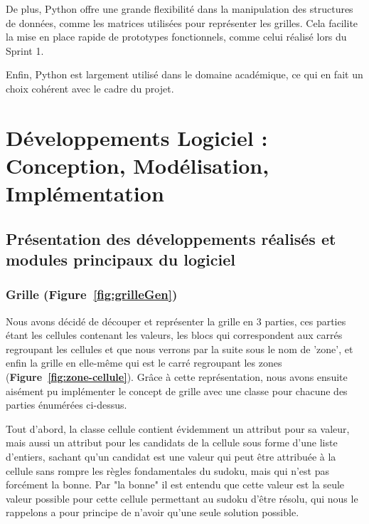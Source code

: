\documentclass[a4paper]{article}
\begin{document}
De plus, Python offre une grande flexibilité dans la manipulation des structures de données, comme les matrices utilisées pour représenter les grilles. Cela facilite la mise en place rapide de prototypes fonctionnels, comme celui réalisé lors du Sprint 1.

Enfin, Python est largement utilisé dans le domaine académique, ce qui en fait un choix cohérent avec le cadre du projet.

\vspace{0.5cm}

\section{Développements Logiciel : Conception, Modélisation, Implémentation}


\subsection{Présentation des développements réalisés et modules principaux du logiciel}

\subsubsection{Grille  (\textbf{Figure~\ref{fig:grilleGen}})} 
Nous avons décidé de découper et représenter la grille en 3 parties, ces parties étant les cellules contenant les valeurs, les blocs qui correspondent aux carrés regroupant les cellules et que nous verrons par la suite sous le nom de 'zone', et enfin la grille en elle-même qui est le carré regroupant les zones (\textbf{Figure~\ref{fig:zone-cellule}}). Grâce à cette représentation, nous avons ensuite aisément pu implémenter le concept de grille avec une classe pour chacune des parties énumérées ci-dessus.

Tout d’abord, la classe cellule contient évidemment un attribut pour sa valeur, mais aussi un attribut pour les candidats de la cellule sous forme d’une liste d’entiers, sachant qu’un candidat est une valeur qui peut être attribuée à la cellule sans rompre les règles fondamentales du sudoku, mais qui n’est pas forcément la bonne. Par "la bonne" il est entendu que cette valeur est la seule valeur possible pour cette cellule permettant au sudoku d’être résolu, qui nous le rappelons a pour principe de n’avoir qu’une seule solution possible. 
\end{document}
